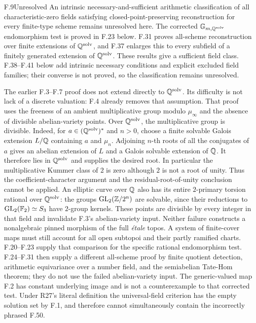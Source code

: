 \begin{claim}{F.9}{Unresolved}
An intrinsic necessary-and-sufficient arithmetic classification of
all characteristic-zero fields satisfying closed-point-preserving
reconstruction for every finite-type scheme remains unresolved here.
The corrected $\mathbb G_{m,\mathbb Q^{\mathrm{solv}}}$ endomorphism
test is proved in F.23 below. F.31 proves all-scheme
reconstruction over finite extensions of $\mathbb Q^{\mathrm{solv}}$,
and F.37 enlarges this to every subfield of a finitely generated
extension of $\mathbb Q^{\mathrm{solv}}$. These results give a
sufficient field class. F.38--F.41 below add intrinsic necessary
conditions and explicit excluded field families; their converse
is not proved, so the classification remains unresolved.
\end{claim}
The earlier F.3--F.7 proof does not extend directly to
$\mathbb Q^{\mathrm{solv}}$. Its difficulty is not lack of a discrete
valuation: F.4 already removes that assumption. That proof uses the
freeness of an ambient multiplicative group modulo $\mu_\infty$
and the absence of divisible abelian-variety points. Over
$\mathbb Q^{\mathrm{solv}}$, the multiplicative group is divisible.
Indeed, for $a\in(\mathbb Q^{\mathrm{solv}})^*$ and $n>0$, choose
a finite solvable Galois extension $L/\mathbb Q$ containing $a$ and
$\mu_n$. Adjoining $n$-th roots of all the conjugates of $a$
gives an abelian extension of $L$ and a Galois solvable extension
of $\mathbb Q$. It therefore lies in $\mathbb Q^{\mathrm{solv}}$ and supplies
the desired root. In particular the multiplicative Kummer class
of $2$ is zero although $2$ is not a root of unity.
Thus the coefficient-character argument and
the residual-root-of-unity conclusion cannot be applied. An elliptic
curve over $\mathbb Q$ also has its entire $2$-primary torsion rational
over $\mathbb Q^{\mathrm{solv}}$: the groups
$\operatorname{GL}_2(\mathbb Z/2^n)$ are solvable, since their reductions
to $\operatorname{GL}_2(\mathbb F_2)\simeq S_3$ have $2$-group kernels.
These points are divisible by every integer in that field and
invalidate F.3's abelian-variety input. Neither failure constructs
a nonalgebraic pinned morphism of the full \emph{\'etale} topos.
A system of finite-cover maps must still account for all open
subtopoi and their partly ramified charts. F.20--F.23 supply that
comparison for the specific rational endomorphism test.
F.24--F.31 then supply a different all-scheme proof by finite
quotient detection, arithmetic equivariance over a number field,
and the semiabelian Tate-Hom theorem; they do not use the failed
abelian-variety input. The generic-valued map
F.2 has constant underlying image and is not a counterexample
to that corrected test. Under R27's literal definition the universal-field
criterion has the empty solution set by F.1, and therefore cannot
simultaneously contain the incorrectly phrased F.50.

